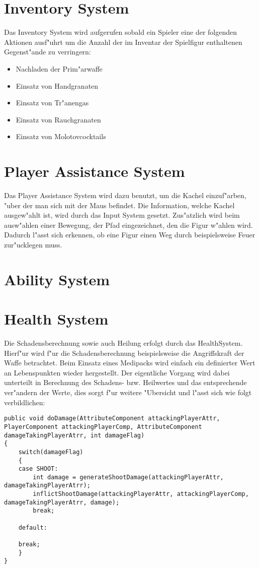 \section{Inventory System}

Das Inventory System wird aufgerufen sobald ein Spieler eine der folgenden Aktionen ausf"uhrt um die Anzahl der im Inventar der Spielfigur enthaltenen Gegenst"ande zu verringern:\newline


\begin{itemize}
	\item Nachladen der Prim"arwaffe
	\item Einsatz von Handgranaten
	\item Einsatz von Tr"anengas
	\item Einsatz von Rauchgranaten
	\item Einsatz von Molotovcocktails
\end{itemize}





\section{Player Assistance System}
Das Player Assistance System wird dazu benutzt, um die Kachel einzuf"arben, "uber der man sich mit der Maus befindet. Die Information, welche Kachel ausgew"ahlt ist, wird durch das Input System gesetzt.
Zus"atzlich wird beim ausw"ahlen einer Bewegung, der Pfad eingezeichnet, den die Figur w"ahlen wird.
Dadurch l"asst sich erkennen, ob eine Figur einen Weg durch beispielsweise Feuer zur"ucklegen muss.


\section{Ability System}



\section{Health System}

Die Schadensberechnung sowie auch Heilung erfolgt durch das HealthSystem. Hierf"ur wird f"ur die Schadensberechnung beispielsweise die Angriffskraft der Waffe betrachtet. Beim Einsatz eines Medipacks wird einfach ein definierter Wert an Lebenspunkten wieder hergestellt.
Der eigentliche Vorgang wird dabei unterteilt in Berechnung des Schadens- bzw. Heilwertes und das entsprechende ver"andern der Werte, dies sorgt f"ur weitere "Ubersicht und l"asst sich wie folgt verbildlichen:

\begin{lstlisting}[breaklines = true]
public void doDamage(AttributeComponent attackingPlayerAttr, PlayerComponent attackingPlayerComp, AttributeComponent damageTakingPlayerAtrr, int damageFlag)
{
	switch(damageFlag)
	{
	case SHOOT:
		int damage = generateShootDamage(attackingPlayerAttr, damageTakingPlayerAtrr);
		inflictShootDamage(attackingPlayerAttr, attackingPlayerComp, damageTakingPlayerAtrr, damage);                    
		break;

	default:

	break;
	}
}
\end{lstlisting}